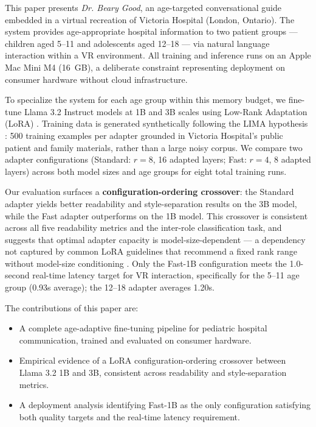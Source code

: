 \documentclass[journal]{IEEEtai}
\begin{document}
This paper presents \textit{Dr. Beary Good}, an age-targeted conversational guide embedded in a virtual recreation of Victoria Hospital (London, Ontario). The system provides age-appropriate hospital information to two patient groups --- children aged 5--11 and adolescents aged 12--18 --- via natural language interaction within a VR environment. All training and inference runs on an Apple Mac Mini M4 (16~GB), a deliberate constraint representing deployment on consumer hardware without cloud infrastructure.

To specialize the system for each age group within this memory budget, we fine-tune Llama 3.2 Instruct models \cite{dubey2024llama3} at 1B and 3B scales using Low-Rank Adaptation (LoRA) \cite{hu2022lora}. Training data is generated synthetically following the LIMA hypothesis \cite{zhou2023lima}: 500 training examples per adapter grounded in Victoria Hospital's public patient and family materials, rather than a large noisy corpus. We compare two adapter configurations (Standard: $r = 8$, 16 adapted layers; Fast: $r = 4$, 8 adapted layers) across both model sizes and age groups for eight total training runs.

Our evaluation surfaces a \textbf{configuration-ordering crossover}: the Standard adapter yields better readability and style-separation results on the 3B model, while the Fast adapter outperforms on the 1B model. This crossover is consistent across all five readability metrics and the inter-role classification task, and suggests that optimal adapter capacity is model-size-dependent --- a dependency not captured by common LoRA guidelines that recommend a fixed rank range without model-size conditioning \cite{biderman2024lora}. Only the Fast-1B configuration meets the 1.0-second real-time latency target for VR interaction, specifically for the 5--11 age group (0.93s average); the 12--18 adapter averages 1.20s.

\medskip\noindent The contributions of this paper are:
\begin{itemize}
    \item A complete age-adaptive fine-tuning pipeline for pediatric hospital communication, trained and evaluated on consumer hardware.
    \item Empirical evidence of a LoRA configuration-ordering crossover between Llama 3.2 1B and 3B, consistent across readability and style-separation metrics.
    \item A deployment analysis identifying Fast-1B as the only configuration satisfying both quality targets and the real-time latency requirement.
\end{itemize}
\end{document}
